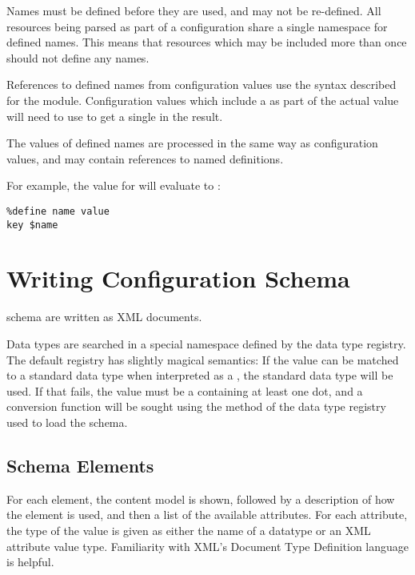 \documentclass{howto}
\newcommand{\datatype}[1]{\strong{#1}}
\begin{document}
Names must be defined before they are used, and may not be
re-defined.  All resources being parsed as part of a configuration
share a single namespace for defined names.  This means that resources
which may be included more than once should not define any names.

References to defined names from configuration values use the syntax
described for the  module.
Configuration values which include a \character{\$} as part of the
actual value will need to use \code{\$\$} to get a single
\character{\$} in the result.

The values of defined names are processed in the same way as
configuration values, and may contain references to named
definitions.

For example, the value for  will evaluate to :

\begin{verbatim}
%define name value
key $name
\end{verbatim} %


\section{Writing Configuration Schema \label{writing-schema}}

 schema are written as XML documents.

Data types are searched in a special namespace defined by the data
type registry.  The default registry has slightly magical semantics:
If the value can be matched to a standard data type when interpreted
as a \datatype{basic-key}, the standard data type will be used.  If
that fails, the value must be a \datatype{dotted-name} containing at
least one dot, and a conversion function will be sought using the
 method of the data type registry used to load the
schema.


\subsection{Schema Elements \label{elements}}

For each element, the content model is shown, followed by a
description of how the element is used, and then a list of the
available attributes.  For each attribute, the type of the value is
given as either the name of a  datatype or an XML
attribute value type.  Familiarity with XML's Document Type Definition
language is helpful.
\end{document}
